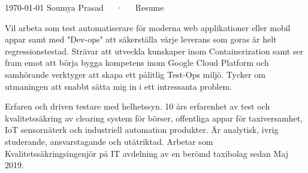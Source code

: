 \documentclass[12pt, a4paper]{awesome-cv}
\begin{document}
\makecvheader

\makecvfooter
  {\today}
  {Soumya Prasad~~~·~~~Resume}
  {\thepage}

\begin{cvparagraph}

    Vil arbeta som test automatiserare för moderna web applikationer eller mobil appar samt med "Dev-ops" att säkerställa
    värje leverans som goras är helt regressionstestad. Strävar att utveckla kunskaper inom Containerization samt ser fram
    emot att börja bygga kompetens inom Google Cloud Platform och samhörande verktyger att skapa ett pålitlig Test-Ops miljö.
    Tycker om utmaningen att snabbt sätta mig in i ett intressanta problem.
\end{cvparagraph}

\begin{cvparagraph}

    Erfaren och driven testare med helhetssyn. 10 års erfarenhet av test och kvalitetssäkring av
    clearing system för börser, offentliga appar för taxiversamhet, IoT sensornäterk och industriell automation produkter.
    Är analytisk, ivrig studerande, ansvarstagande och utåtriktad.
    Arbetar som Kvalitetssäkringsingenjör på IT avdelning av en berömd taxibolag sedan Maj 2019.
\end{cvparagraph}
\end{document}
